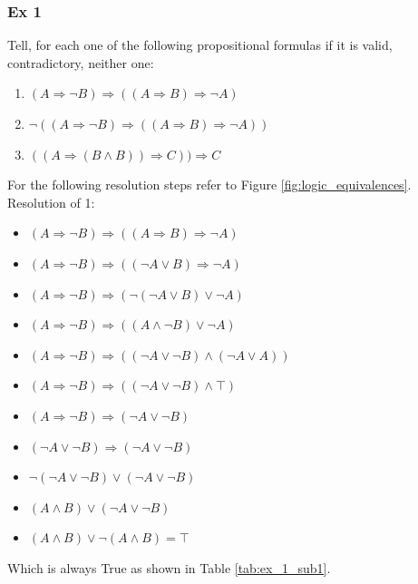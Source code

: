 \documentclass[10pt,a4paper]{article}
\begin{document}
\subsubsection{Ex 1}
Tell, for each one of the following propositional formulas if it is valid, contradictory, neither one:
\begin{enumerate}
\item $(A\Rightarrow \neg B)\Rightarrow((A\Rightarrow B)\Rightarrow \neg A)$
\item $\neg ((A\Rightarrow \neg B)\Rightarrow ((A\Rightarrow B)\Rightarrow \neg A))$
\item $((A\Rightarrow (B\wedge B))\Rightarrow C))\Rightarrow C$
\end{enumerate}
For the following resolution steps refer to Figure \ref{fig:logic_equivalences}.\\
Resolution of 1:
\begin{itemize}
\item $(A\Rightarrow \neg B)\Rightarrow((A\Rightarrow B)\Rightarrow \neg A)$
\item $(A\Rightarrow \neg B)\Rightarrow((\neg A\vee B)\Rightarrow \neg A)$
\item $(A\Rightarrow \neg B)\Rightarrow(\neg (\neg A\vee B)\vee \neg A)$
\item $(A\Rightarrow \neg B)\Rightarrow((A \wedge \neg B)\vee \neg A)$
\item $(A\Rightarrow \neg B)\Rightarrow((\neg A \vee \neg B)\wedge (\neg A \vee A))$
\item $(A\Rightarrow \neg B)\Rightarrow((\neg A \vee \neg B)\wedge \top)$
\item $(A\Rightarrow \neg B)\Rightarrow(\neg A \vee \neg B)$
\item $(\neg A\vee \neg B)\Rightarrow(\neg A \vee \neg B)$
\item $\neg (\neg A\vee \neg B)\vee (\neg A \vee \neg B)$
\item $ ( A \wedge B) \vee (\neg A \vee \neg B)$
\item $ ( A \wedge B) \vee \neg ( A \wedge  B)=\top$
\end{itemize}
Which is always True as shown in Table \ref{tab:ex_1_sub1}.\\
\end{document}
